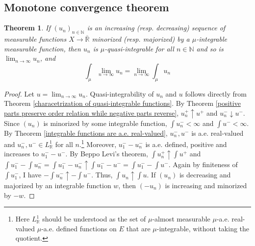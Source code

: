 \documentclass[11pt, a4paper, openany]{book}
\newtheorem{thm}{Theorem}\newtheorem{lem}{Lemma}\newtheorem{crl}{Corollary}
\theoremstyle{definition}
\newcommand{\cat}[1]{\textup{\textsf{#1}}}
\newcommand{\er}{\overline{\mathbb{R}}}
\begin{document}

\subsection{Monotone convergence theorem}
    \begin{thm}
        If $(u_n)_{n\in\mathbb{N}}$ is an increasing (resp. decreasing) sequence of measurable functions $X\rightarrow \er$ minorized (resp. majorized) by a $\mu$-integrable measurable function, then $u_n$ is $\mu$-quasi-integrable for all $n\in\mathbb{N}$ and so is $\lim_{n\to\infty}u_n$, and
        \[
            \int_\mu \lim_{n\to\infty}u_n=\lim_{n\to\infty} \int_\mu u_n
        \]
    \end{thm}
    \begin{proof}
        Let $u=\lim_{n\to\infty}u_n$. Quasi-integrability of $u_n$ and $u$ follows directly from Theorem \ref{characetrization of quasi-integrable functions}. By Theorem \ref{positive parts preserve order relation while negative parts reverse}, $u_n^+\uparrow u^+$ and $u_n^-\downarrow u^-$. Since $(u_n)$ is minorized by some integrable function, $\int u_n^-<\infty$ and $\int u^-<\infty$. By Theorem \ref{integrable functions are a.e. real-valued}, $u_n^-,u^-$ is a.e. real-valued and $u_n^-,u^-\in L^1_\mathbb{R}$ for all $n$.\footnote{
            Here $L^1_\mathbb{R}$ should be understood as the set of $\mu$-almost measurable $\mu$-a.e.\! real-valued $\mu$-a.e.\! defined functions on $E$ that are $\mu$-integrable, without taking the quotient.
        } Moreover, $u_1^--u_n^-$ is a.e. defined, positive and increases to $u_1^--u^-$. By Beppo Levi's theorem, $\int u_n^+\uparrow \int u^+$ and $\int u_1^--\int u_n^-=\int u_1^--u_n^-\uparrow \int u_1^--u^-=\int u_1^--\int u^-$. Again by finiteness of $\int u_1^-$, I have $-\int u_n^-\uparrow -\int u^-$. Thus, $\int u_n\uparrow \int u$. If $(u_n)$ is decreasing and majorized by an integrable function $w$, then $(-u_n)$ is increasing and minorized by $-w$.
    \end{proof}
\end{document}
